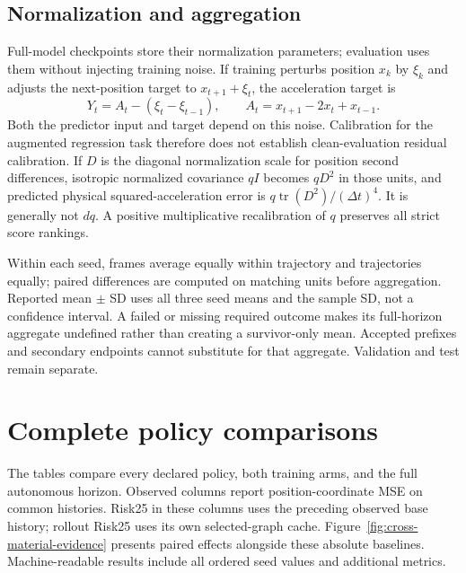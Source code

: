 \subsection{Normalization and aggregation}
\label{sec:noise-augmentation}
Full-model checkpoints store their normalization parameters; evaluation uses them without injecting training noise. If training perturbs position $x_k$ by $\xi_k$ and adjusts the next-position target to $x_{t+1}+\xi_t$, the acceleration target is
\begin{equation}
 Y_t=A_t-(\xi_t-\xi_{t-1}),\qquad A_t=x_{t+1}-2x_t+x_{t-1}.
 \label{eq:noise-target-identity}
\end{equation}
Both the predictor input and target depend on this noise. Calibration for the augmented regression task therefore does not establish clean-evaluation residual calibration. If $D$ is the diagonal normalization scale for position second differences, isotropic normalized covariance $qI$ becomes $qD^2$ in those units, and predicted physical squared-acceleration error is $q\operatorname{tr}(D^2)/(\Delta t)^4$. It is generally not $dq$. A positive multiplicative recalibration of $q$ preserves all strict score rankings.

Within each seed, frames average equally within trajectory and trajectories equally; paired differences are computed on matching units before aggregation. Reported mean $\pm$ SD uses all three seed means and the sample SD, not a confidence interval. A failed or missing required outcome makes its full-horizon aggregate undefined rather than creating a survivor-only mean. Accepted prefixes and secondary endpoints cannot substitute for that aggregate. Validation and test remain separate.

\section{Complete policy comparisons}
\label{sec:complete-policy-comparisons}
The tables compare every declared policy, both training arms, and the full autonomous horizon. Observed columns report position-coordinate MSE on common histories. Risk25 in these columns uses the preceding observed base history; rollout Risk25 uses its own selected-graph cache. Figure~\ref{fig:cross-material-evidence} presents paired effects alongside these absolute baselines. Machine-readable results include all ordered seed values and additional metrics.


